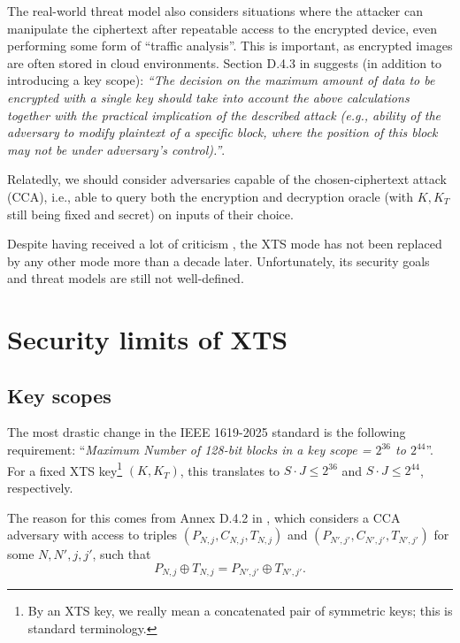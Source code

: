 \documentclass[a4paper]{article}
\begin{document}
The real-world threat model also considers situations where the attacker can manipulate the ciphertext after repeatable access to the encrypted device, even performing some form of ``traffic analysis''. This is important, as encrypted images are often stored in cloud environments.
Section D.4.3 in \cite{IEEE1619-2025} suggests (in addition to introducing a key scope): \emph{``The decision on the maximum amount of data to be encrypted with a single key should take into account the above calculations together with the practical implication of the described attack (e.g., ability of the adversary to modify plaintext of a specific block, where the position of this block may not be under adversary’s control).''}.

Relatedly, we should consider adversaries capable of the chosen-ciphertext attack (CCA), i.e., able to query both the encryption and decryption oracle (with $K, K_T$ still being fixed and secret) on inputs of their choice.

Despite having received a lot of criticism \cite{rogaway2011evaluation,ptacek2014xts}, the XTS mode has not been replaced by any other mode more than a decade later. Unfortunately, its security goals and threat models are still not well-defined.

\section{Security limits of XTS}\label{sec:limits}

\subsection{Key scopes}\label{sec:key-scopes}
The most drastic change in the IEEE 1619-2025 standard \cite{IEEE1619-2025} is the following requirement: ``\emph{Maximum Number of 128-bit blocks in a key scope = $2^{36}$ to $2^{44}$}''. For a fixed XTS key\footnote{By an XTS key, we really mean a concatenated pair of symmetric keys; this is standard terminology.} $(K, K_T)$, this translates to $S\cdot J \le 2^{36}$ and $S\cdot J \le 2^{44}$, respectively.

The reason for this comes from Annex D.4.2 in \cite{IEEE1619-2025}, which considers a CCA adversary with access to triples $(P_{N,j}, C_{N,j}, T_{N,j})$ and $(P_{N',j'}, C_{N',j'}, T_{N',j'})$ for some $N, N', j, j'$, such that
\begin{equation}\label{collision}
    P_{N,j} \oplus T_{N,j} = P_{N',j'} \oplus T_{N',j'}.
\end{equation}
\end{document}

